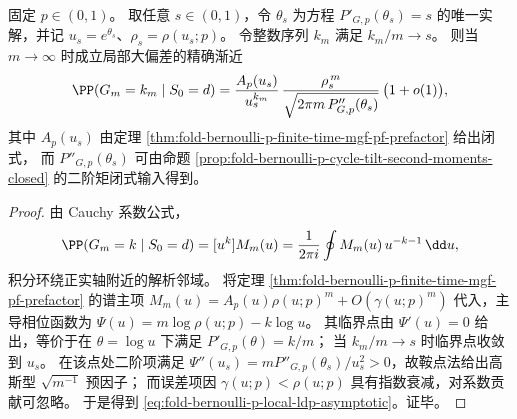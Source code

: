 \begin{theorem}\label{thm:fold-bernoulli-p-local-ldp-prefactor}
固定 \(p\in(0,1)\)。
取任意 \(s\in(0,1)\)，令 \(\theta_s\) 为方程
\(
P'_{G,p}(\theta_s)=s
\)
的唯一实解，并记 \(u_s=e^{\theta_s}\)、\(\rho_s=\rho(u_s;p)\)。
令整数序列 \(k_m\) 满足 \(k_m/m\to s\)。
则当 \(m\to\infty\) 时成立局部大偏差的精确渐近
\begin{equation}\label{eq:fold-bernoulli-p-local-ldp-asymptotic}
\PP(G_m=k_m\mid S_0=d)
=
\frac{A_p(u_s)}{u_s^{k_m}}\,
\frac{\rho_s^{\,m}}{\sqrt{2\pi m\,P''_{G,p}(\theta_s)}}\,
\bigl(1+o(1)\bigr),
\end{equation}
其中 \(A_p(u_s)\) 由定理 \ref{thm:fold-bernoulli-p-finite-time-mgf-pf-prefactor} 给出闭式，
而 \(P''_{G,p}(\theta_s)\) 可由命题 \ref{prop:fold-bernoulli-p-cycle-tilt-second-moments-closed} 的二阶矩闭式输入得到。
\end{theorem}
\begin{proof}
由 Cauchy 系数公式，
\[
\PP(G_m=k\mid S_0=d)=[u^k]M_m(u)=\frac{1}{2\pi i}\oint M_m(u)\,u^{-k-1}\,\dd u,
\]
积分环绕正实轴附近的解析邻域。
将定理 \ref{thm:fold-bernoulli-p-finite-time-mgf-pf-prefactor} 的谱主项
\(
M_m(u)=A_p(u)\rho(u;p)^m+O(\gamma(u;p)^m)
\)
代入，主导相位函数为
\(
\Psi(u)=m\log\rho(u;p)-k\log u
\)。
其临界点由 \(\Psi'(u)=0\) 给出，等价于在 \(\theta=\log u\) 下满足 \(P'_{G,p}(\theta)=k/m\)；
当 \(k_m/m\to s\) 时临界点收敛到 \(u_s\)。
在该点处二阶项满足 \(\Psi''(u_s)=mP''_{G,p}(\theta_s)/u_s^2>0\)，故鞍点法给出高斯型 \(\sqrt{m^{-1}}\) 预因子；
而误差项因 \(\gamma(u;p)<\rho(u;p)\) 具有指数衰减，对系数贡献可忽略。
于是得到 \eqref{eq:fold-bernoulli-p-local-ldp-asymptotic}。证毕。
\end{proof}

\endinput
